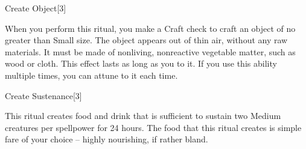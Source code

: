 \begin{spellsection}{Create Object}[3]
\begin{spellcontent}
\begin{spelltargetinginfo}
\spellrng{\rngclose}
\end{spelltargetinginfo}
\begin{spelleffects}
\spelleffect
When you perform this ritual, you make a Craft check to craft an object of no greater than Small size.
The object appears out of thin air, without any raw materials.
It must be made of nonliving, nonreactive vegetable matter, such as wood or cloth.
This effect lasts as long as you  to it.
If you use this ability multiple times, you can attune to it each time.
\end{spelleffects}
\end{spellcontent}
\begin{spellfooter}
\end{spellfooter}
\begin{spellsubcontent}
\end{spellsubcontent}
\end{spellsection}
\begin{spellsection}{Create Sustenance}[3]
\begin{spellcontent}
\begin{spelltargetinginfo}
\spellrng{\rngclose}
\end{spelltargetinginfo}
\begin{spelleffects}
\spelleffect
This ritual creates food and drink that is sufficient to sustain two Medium creatures per spellpower for 24 hours.
The food that this ritual creates is simple fare of your choice -- highly nourishing, if rather bland.
\end{spelleffects}
\end{spellcontent}
\begin{spellfooter}
\end{spellfooter}
\begin{spellsubcontent}
\end{spellsubcontent}
\end{spellsection}
